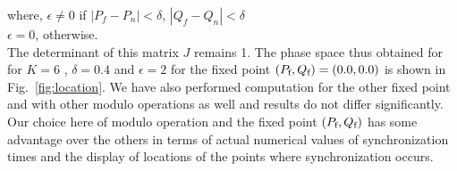 \documentclass[reprint,amsmath,amssymb,aps,pre]{revtex4-1}
\begin{document}
\vspace{0.2cm}
	where, $ \epsilon \neq 0$ if $|P_f - P_n| < \delta$, $|Q_f - Q_n| < 
	\delta$\\ $\epsilon = 0$, otherwise.\\

The determinant of this matrix $J$ remains 1. The phase space thus obtained 
for for $K = 6$ , $\delta = 0.4$ and $\epsilon = 2$ for the fixed point 
$(P_\textnormal{f},Q_\textnormal{f})=(0.0,0.0)$ is shown in 
Fig.~\ref{fig:location}.   We have also 
performed computation for the other fixed point and with other modulo 
operations as well and results do not differ significantly. Our choice here of 
modulo operation and the fixed point $(P_\textnormal{f},Q_\textnormal{f})$ has 
some advantage over the 
others in terms of actual numerical values of synchronization times and the 
display of locations of the points where synchronization occurs. 
\end{document}
